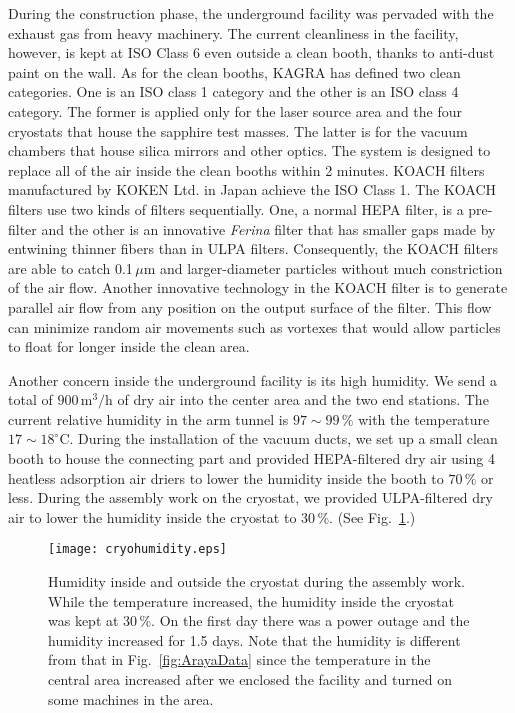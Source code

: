 \documentclass[prd ,twocolumn ,secnumarabic,dvips
,amssymb, amsmath,nobibnotes, aps, prd,superscriptaddress]{revtex4-1}
\begin{document}
{During the construction phase, the underground facility was pervaded with the exhaust gas from heavy machinery. The current cleanliness in the facility, however, is kept at ISO Class 6 even outside a clean booth, thanks to anti-dust paint on the wall.
As for the clean booths, KAGRA has defined two clean categories. One is an ISO class 1 category and the other is an ISO class 4 category. The former is applied only for the laser source area and the four cryostats that house the sapphire test masses. The latter is for the vacuum chambers that house silica mirrors and other optics. The system is designed to replace all of the air inside the clean booths within 2 minutes. KOACH filters manufactured by KOKEN Ltd. in Japan achieve the ISO Class 1. The KOACH filters use two kinds of filters sequentially. One, a normal HEPA filter, is a pre-filter and the other is an innovative {\it Ferina} filter that has smaller gaps made by entwining thinner fibers than in ULPA filters. Consequently, the KOACH filters are able to catch 0.1\,$\mu\mathrm{m}$ and larger-diameter particles without much constriction of the air flow. Another innovative technology in the KOACH filter is to generate parallel air flow from any position on the output surface of the filter. This flow can minimize random air movements such as vortexes that would allow particles to float for longer inside the clean area.

Another concern inside the underground facility is its high humidity. We send a total of $900\,\mathrm{m}^3/\mathrm{h}$ of dry air into the center area and the two end stations. The current relative humidity in the arm tunnel is $97\sim99\,\%$ with the temperature $17\sim18^\circ$C. During the installation of the vacuum ducts, we set up a small clean booth to house the connecting part and provided HEPA-filtered dry air using 4 heatless adsorption air driers to lower the humidity inside the booth to $70\,\%$ or less. During the assembly work on the cryostat, we provided ULPA-filtered dry air to lower the humidity inside the cryostat to $30\,\%$. (See Fig.~\ref{fig:cryohumidity}.)

\begin{figure}[htbp]
	\begin{center}
		\texttt{[image: cryohumidity.eps]}
		\caption{\label{fig:cryohumidity}Humidity inside and outside the cryostat during the assembly work. While the temperature increased, the humidity inside the cryostat was kept at 30\,\%. On the first day there was a power outage and the humidity increased for 1.5 days. Note that the humidity is different from that in Fig.~\ref{fig:ArayaData} since the temperature in the central area increased after we enclosed the facility and turned on some machines in the area.}
	\end{center}
\end{figure}


}
\end{document}
